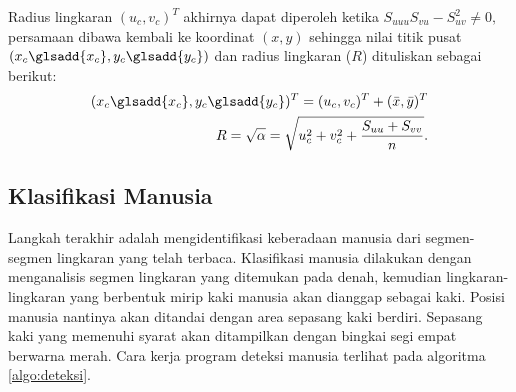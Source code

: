 %
Radius lingkaran $(u_c, v_c)^T$ akhirnya dapat diperoleh ketika $S_{uuu}S_{vu}-S^2_{uv} \neq 0,$ persamaan dibawa kembali ke koordinat $(x,y)$ sehingga nilai titik pusat $(x_c\glsadd{x_c},y_c\glsadd{y_c})$ dan radius lingkaran ($R$) dituliskan sebagai berikut:
\begin{align}
    \label{eqn:final_circle_equation}
    (x_c\glsadd{x_c},y_c\glsadd{y_c})^T=(u_c,v_c)^T+(\bar{x},\bar{y})^T\\
    R=\sqrt{\alpha}=\sqrt{u_c^2+v_c^2+\frac{S_{uu}+S_{vv}}{n}}.
\end{align}

\subsection{Klasifikasi Manusia}
\label{sec:Klasifikasi}

Langkah terakhir adalah mengidentifikasi keberadaan manusia dari segmen-segmen lingkaran yang telah terbaca. Klasifikasi manusia dilakukan dengan menganalisis segmen lingkaran yang ditemukan pada denah, kemudian lingkaran-lingkaran yang berbentuk mirip kaki manusia akan dianggap sebagai kaki. Posisi manusia nantinya akan ditandai dengan area sepasang kaki berdiri. Sepasang kaki yang memenuhi syarat akan ditampilkan dengan bingkai  segi empat berwarna merah. Cara kerja program deteksi manusia terlihat pada algoritma \ref*{algo:deteksi}.

